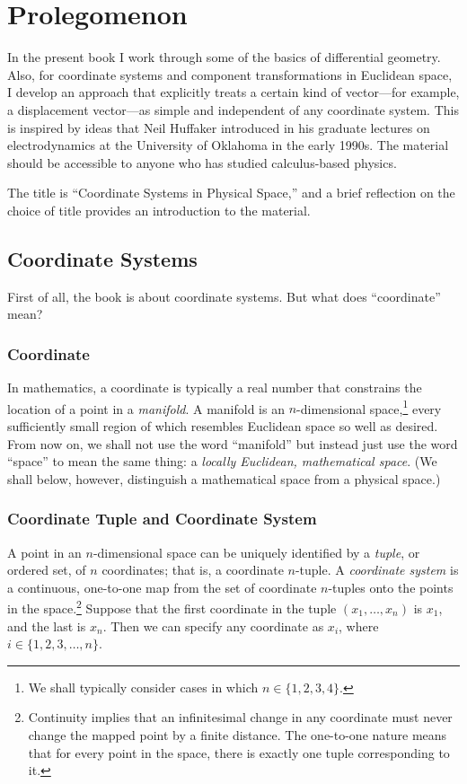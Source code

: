 

\chapter{Prolegomenon}

In the present book I work through some of the basics of differential geometry.
Also, for coordinate systems and component transformations in Euclidean space,
I develop an approach that explicitly treats a certain kind of vector---for
example, a displacement vector---as simple and independent of any coordinate
system.  This is inspired by ideas that Neil Huffaker introduced in his
graduate lectures on electrodynamics at the University of Oklahoma in the early
1990s.  The material should be accessible to anyone who has studied
calculus-based physics.

The title is ``Coordinate Systems in Physical Space,'' and a brief reflection
on the choice of title provides an introduction to the material.

\section{Coordinate Systems}

First of all, the book is about coordinate systems.  But what does
``coordinate'' mean?

\subsection{Coordinate}

In mathematics, a coordinate is typically a real number that constrains the
location of a point in a \emph{manifold}.  A manifold is an $n$-dimensional
space,\footnote{%
   We shall typically consider cases in which $n \in \{1, 2, 3, 4\}$.%
}
every sufficiently small region of which resembles Euclidean space so well as
desired.  From now on, we shall not use the word ``manifold'' but instead just
use the word ``space'' to mean the same thing: a \emph{locally Euclidean,
mathematical space}.  (We shall below, however, distinguish a mathematical
space from a physical space.)

\subsection{Coordinate Tuple and Coordinate System}

A point in an $n$-dimensional space can be uniquely identified by a
\emph{tuple}, or ordered set, of $n$ coordinates; that is, a coordinate
$n$-tuple.  A \emph{coordinate system} is a continuous, one-to-one map from the
set of coordinate $n$-tuples onto the points in the space.\footnote{%
   Continuity implies that an infinitesimal change in any coordinate must never
   change the mapped point by a finite distance.  The one-to-one nature means
   that for every point in the space, there is exactly one tuple corresponding
   to it.%
}
Suppose that the first coordinate in the tuple $(x_1, \ldots, x_n)$ is $x_1$,
and the last is $x_n$.  Then we can specify any coordinate as $x_i$, where $i
\in \{1, 2, 3, \ldots, n\}$.

